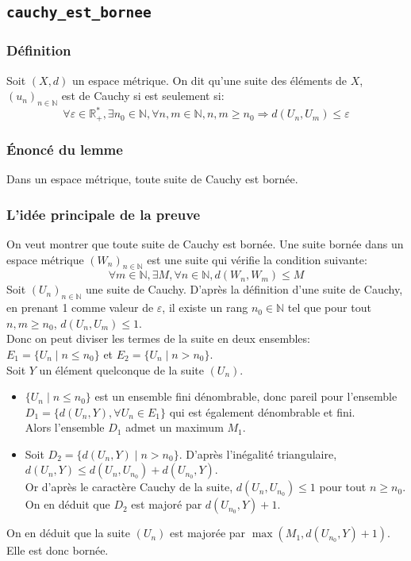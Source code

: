 \subsection{\texttt{cauchy\_est\_bornee}}
\subsubsection{Définition}
Soit $(X,d)$ un espace métrique. On dit qu'une suite des éléments de $X$, $(u_n)_{n\in \mathbb{N}}$ est de Cauchy si est seulement si: $$\forall \varepsilon \in \mathbb{R_+^*}, \exists n_0 \in \mathbb{N}, \forall n,m \in \mathbb{N}, n,m \geq n_0 \Rightarrow d(U_n,U_m) \leq \varepsilon$$ 
\subsubsection{\'Enoncé du lemme}
Dans un espace métrique, toute suite de Cauchy est bornée.

\subsubsection{L'idée principale de la preuve}
On veut montrer que toute suite de Cauchy est bornée. Une suite bornée dans un espace métrique $(W_n)_{n\in\mathbb{N}}$ est une suite qui vérifie la condition suivante:$$ \forall m \in \mathbb{N}, \exists M , \forall n \in \mathbb{N}, d(W_n,W_m)\leq M $$
Soit $(U_n)_{n\in\mathbb{N}}$ une suite de Cauchy.
D'après la définition d'une suite de Cauchy, en prenant 1 comme valeur de $\varepsilon$, il existe un rang $n_0 \in \mathbb{N}$ tel que pour tout $n,m \geq n_0$, $d(U_n,U_m)\leq 1$.\\ Donc on peut diviser les termes de la suite en deux ensembles: \\ $E_1=\big\{U_n\mid n\leq n_0 \big\}$ et $E_2=\big\{U_n\mid n > n_0 \big\}$. \\
Soit $Y$ un élément quelconque de la suite $(U_n)$.
\begin{itemize}
    \item $\big\{U_n\mid n\leq n_0 \big\}$ est un ensemble fini dénombrable, donc pareil pour l'ensemble $D_1=\big\{d(U_n,Y), \forall U_n\in E_1\big\}$ qui est également dénombrable et fini.\\ Alors l'ensemble $D_1$ admet un maximum $M_1$.
    \item Soit $D_2=\big\{d(U_n,Y)\mid n> n_0 \big\}$. D'après l'inégalité triangulaire, $d(U_n,Y)\leq d(U_n,U_{n_0})+d(U_{n_0},Y)$.\\ Or d'après le caractère Cauchy de la suite, $d(U_n,U_{n_0})\leq 1$ pour tout $n\geq n_0$.\\ On en déduit que $D_2$ est majoré par $d(U_{n_0},Y)+1$. 
\end{itemize}
On en déduit que la suite $(U_n)$ est majorée par $\max(M_1,d(U_{n_0},Y)+1)$. Elle est donc bornée.\\


